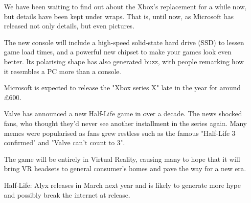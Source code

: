\documentclass{article}
\begin{document}
\closearticle

\pagebreak



\begin{multicols}{2}
We have been waiting to find out about the Xbox's replacement for a while now, but details have been kept under wraps. That is, until now, as Microsoft has released not only details, but even pictures.

The new console will include a high-speed solid-state hard drive (SSD) to lessen game load times, and a powerful new chipset to make your games look even better. Its polarising shape has also generated buzz, with people remarking how it resembles a PC more than a console.

Microsoft is expected to release the "Xbox series X" late in the year for around £600.


    Valve has announced a new Half-Life game in over a decade. The news shocked fans, who thought they'd never see another installment in the series again. Many memes were popularised as fans grew restless such as the famous "Half-Life 3 confirmed" and "Valve can't count to 3".
    
    The game will be entirely in Virtual Reality, causing many to hope that it will bring VR headsets to general consumer's homes and pave the way for a new era. 
    
    Half-Life: Alyx releases in March next year and is likely to generate more hype and possibly break the internet at release.


\end{multicols}
\closearticle
\end{document}
